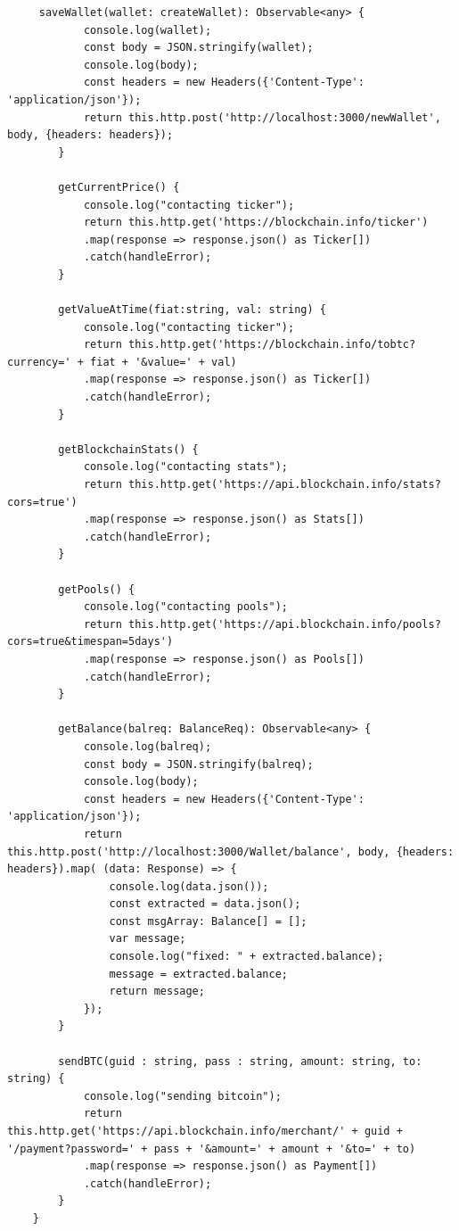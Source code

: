 \begin{lstlisting}
     saveWallet(wallet: createWallet): Observable<any> {
            console.log(wallet);
            const body = JSON.stringify(wallet);
            console.log(body);
            const headers = new Headers({'Content-Type': 'application/json'});
            return this.http.post('http://localhost:3000/newWallet', body, {headers: headers});
        }

        getCurrentPrice() {
            console.log("contacting ticker");
            return this.http.get('https://blockchain.info/ticker')
            .map(response => response.json() as Ticker[])
            .catch(handleError);
        }

        getValueAtTime(fiat:string, val: string) {
            console.log("contacting ticker");
            return this.http.get('https://blockchain.info/tobtc?currency=' + fiat + '&value=' + val)
            .map(response => response.json() as Ticker[])
            .catch(handleError);
        }

        getBlockchainStats() {
            console.log("contacting stats");
            return this.http.get('https://api.blockchain.info/stats?cors=true')
            .map(response => response.json() as Stats[])
            .catch(handleError);
        }

        getPools() {
            console.log("contacting pools");
            return this.http.get('https://api.blockchain.info/pools?cors=true&timespan=5days')
            .map(response => response.json() as Pools[])
            .catch(handleError);
        }

        getBalance(balreq: BalanceReq): Observable<any> {
            console.log(balreq);
            const body = JSON.stringify(balreq);
            console.log(body);
            const headers = new Headers({'Content-Type': 'application/json'});
            return this.http.post('http://localhost:3000/Wallet/balance', body, {headers: headers}).map( (data: Response) => {
                console.log(data.json());
                const extracted = data.json();
                const msgArray: Balance[] = [];
                var message;
                console.log("fixed: " + extracted.balance);
                message = extracted.balance;
                return message;
            });
        }

        sendBTC(guid : string, pass : string, amount: string, to: string) {
            console.log("sending bitcoin");
            return this.http.get('https://api.blockchain.info/merchant/' + guid + '/payment?password=' + pass + '&amount=' + amount + '&to=' + to)
            .map(response => response.json() as Payment[])
            .catch(handleError);
        }
    }
\end{lstlisting}

